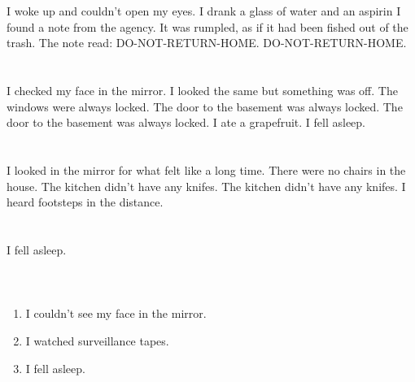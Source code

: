 \documentclass{article}
\begin{document}
    \section{}
    I woke up and couldn't open my eyes. I drank a glass of water and an aspirin I found a note from the agency. It was rumpled, as if it had been fished out of the trash. The note read: DO-NOT-RETURN-HOME. DO-NOT-RETURN-HOME.  
    \newpage
    
    \section{}
    I checked my face in the mirror. I looked the same but something was off. The windows were always locked. The door to the basement was always locked. The door to the basement was always locked. I ate a grapefruit. I fell asleep.  
    \newpage
    
    \section{}
    I looked in the mirror for what felt like a long time. There were no chairs in the house. The kitchen didn't have any knifes. The kitchen didn't have any knifes. I heard footsteps in the distance.  
    \newpage
    
    \section{}
    I fell asleep.\\\\ 
    \newpage
    
    \section{}
    
    \begin{enumerate}
    
    \item I couldn't see my face in the mirror.\\
    
    \item I watched surveillance tapes.\\
    
    \item I fell asleep.\\
    
    \end{enumerate}
     
\end{document}
